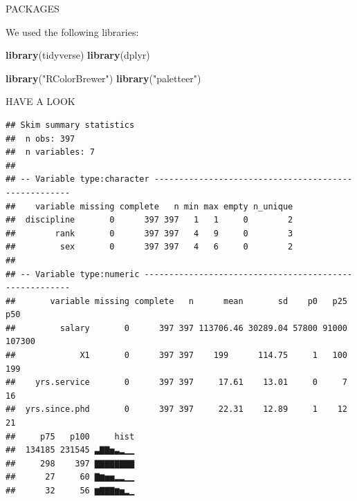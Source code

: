 \documentclass[ignorenonframetext,]{beamer}
\newenvironment{Shaded}{\begin{snugshade}}{\end{snugshade}}
\newcommand{\KeywordTok}[1]{\textcolor[rgb]{0.13,0.29,0.53}{\textbf{#1}}}
\newcommand{\StringTok}[1]{\textcolor[rgb]{0.31,0.60,0.02}{#1}}
\newcommand{\OperatorTok}[1]{\textcolor[rgb]{0.81,0.36,0.00}{\textbf{#1}}}
\newcommand{\NormalTok}[1]{#1}
\begin{document}
\begin{frame}[fragile]{PACKAGES}

We used the following libraries:

\begin{Shaded}
\begin{Highlighting}[]
\KeywordTok{library}\NormalTok{(tidyverse)}
\KeywordTok{library}\NormalTok{(dplyr)}
\end{Highlighting}
\end{Shaded}

\begin{Shaded}
\begin{Highlighting}[]
\KeywordTok{library}\NormalTok{(}\StringTok{"RColorBrewer"}\NormalTok{)}
\KeywordTok{library}\NormalTok{(}\StringTok{"paletteer"}\NormalTok{)}
\end{Highlighting}
\end{Shaded}

\begin{block}{HAVE A LOOK}

\begin{Shaded}
\end{Shaded}

\begin{verbatim}
## Skim summary statistics
##  n obs: 397 
##  n variables: 7 
## 
## -- Variable type:character -----------------------------------------------------
##    variable missing complete   n min max empty n_unique
##  discipline       0      397 397   1   1     0        2
##        rank       0      397 397   4   9     0        3
##         sex       0      397 397   4   6     0        2
## 
## -- Variable type:numeric -------------------------------------------------------
##       variable missing complete   n      mean       sd    p0   p25    p50
##         salary       0      397 397 113706.46 30289.04 57800 91000 107300
##             X1       0      397 397    199      114.75     1   100    199
##    yrs.service       0      397 397     17.61    13.01     0     7     16
##  yrs.since.phd       0      397 397     22.31    12.89     1    12     21
##     p75   p100     hist
##  134185 231545 ▃▇▇▅▃▂▁▁
##     298    397 ▇▇▇▇▇▇▇▇
##      27     60 ▇▆▅▅▂▂▁▁
##      32     56 ▆▇▇▇▆▅▂▁
\end{verbatim}


\end{block}
\end{frame}
\end{document}
